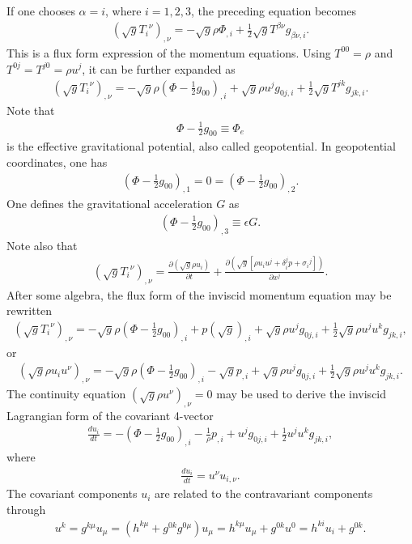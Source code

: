 \documentclass{article}
\begin{document}
If one chooses $\alpha=i$, where $i=1,2,3$, the preceding equation becomes
\begin{align}
\left( \sqrt{g}{{T_i}^\nu}\right)_{,\nu} = - \sqrt{g} \rho \Phi_{,i} + \frac{1}{2} \sqrt{g} T^{\beta\nu} g_{\beta\nu , i}.
\end{align}
This is a flux form expression of the momentum equations. Using $T^{00}=\rho$ and $T^{0j}=T^{j0}=\rho u^j$, it can be further expanded as
\begin{align}
\left( \sqrt{g}{{T_i}^\nu}\right)_{,\nu} = - \sqrt{g} \rho \left( \Phi - \frac{1}{2} g_{00} \right)_{,i} + \sqrt{g} \rho u^j g_{0j , i} + \frac{1}{2} \sqrt{g} T^{jk} g_{jk , i}.
\end{align}
Note that
\begin{align}
\Phi - \frac{1}{2} g_{00} \equiv \Phi_e
\end{align}
is the effective gravitational potential, also called geopotential. In geopotential coordinates, one has
\begin{align}
\left( \Phi - \frac{1}{2} g_{00} \right)_{,1}=0=\left( \Phi - \frac{1}{2} g_{00} \right)_{,2}.
\end{align}
One defines the gravitational acceleration $G$ as
\begin{align}
\left( \Phi - \frac{1}{2} g_{00} \right)_{,3}\equiv \epsilon G.
\end{align}
Note also that
\begin{align}
\left( \sqrt{g}{{T_i}^\nu}\right)_{,\nu} = \frac{\partial(\sqrt{g} \rho u_i)}{\partial t} + \frac{\partial (\sqrt{g} [\rho u_iu^j+\delta^j_ip+{\sigma_i}^j])}{\partial x^j}.
\end{align}
After some algebra, the flux form of the inviscid momentum equation may be rewritten
\begin{align}
\left( \sqrt{g}{T_i}^\nu\right)_{,\nu} = - \sqrt{g} \rho \left( \Phi - \frac{1}{2} g_{00} \right)_{,i} + p (\sqrt{g})_{,i}+ \sqrt{g} \rho u^j g_{0j , i} + \frac{1}{2} \sqrt{g} \rho u^ju^k g_{jk , i},
\end{align}
or
\begin{align}
\left( \sqrt{g}\rho u_iu^\nu\right)_{,\nu} = - \sqrt{g} \rho \left( \Phi - \frac{1}{2} g_{00} \right)_{,i} - \sqrt{g}p_{,i}+ \sqrt{g} \rho u^j g_{0j , i} + \frac{1}{2} \sqrt{g} \rho u^ju^k g_{jk , i}.
\end{align}
The continuity equation $(\sqrt{g}\rho u^\nu)_{,\nu}=0$ may be used to derive the inviscid Lagrangian form of the covariant 4-vector 
\begin{align}
\frac{du_i}{dt} = - \left( \Phi - \frac{1}{2} g_{00} \right)_{,i} - \frac{1}{\rho}p_{,i}+ u^j g_{0j , i} + \frac{1}{2} u^ju^k g_{jk , i},
\end{align}
where
\begin{align}
\frac{du_i}{dt} = u^\nu u_{i,\nu}.
\end{align}
The covariant components $u_i$ are related to the contravariant components through
\begin{align}
u^k=g^{k\mu}u_\mu=(h^{k\mu}+g^{0k}g^{0\mu})u_\mu=h^{k\mu}u_\mu+g^{0k}u^0=h^{ki}u_i+g^{0k}.
\end{align}
\end{document}
